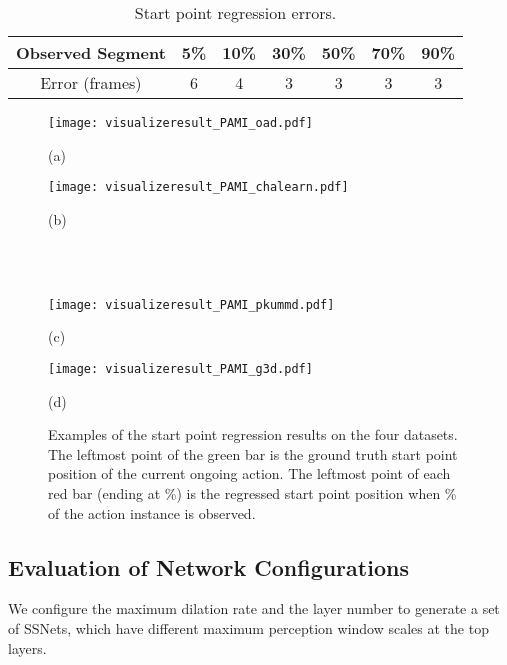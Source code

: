 \documentclass[10pt,twocolumn,letterpaper]{article}
\begin{document}
\begin{table}[tbp]
	\caption{Start point regression errors.}
	\label{table:resultRegErr}
	\centering
	\small
	\begin{tabular}{ccccccc}
		\toprule
Observed Segment       & 5\%   &   10\%   &    30\%   &    50\%    & 70\%  &  90\% \\
		\midrule
		Error (frames)         &   6   &    4     &    3      &    3       &  3    &  3   \\
		\bottomrule
	\end{tabular}
\end{table}



\begin{figure}[tbp]
\begin{minipage}[b]{0.5\linewidth}
		\centering
		\centerline{\texttt{[image: visualizeresult\_PAMI\_oad.pdf]}}
        (a)
\end{minipage}
\begin{minipage}[b]{0.49\linewidth}
		\centering
		\centerline{\texttt{[image: visualizeresult\_PAMI\_chalearn.pdf]}}
        (b)
\end{minipage}
\\
\\
\begin{minipage}[b]{0.5\linewidth}
		\centering
		\centerline{\texttt{[image: visualizeresult\_PAMI\_pkummd.pdf]}}
        (c)
	\end{minipage}
\begin{minipage}[b]{0.49\linewidth}
		\centering
		\centerline{\texttt{[image: visualizeresult\_PAMI\_g3d.pdf]}}
        (d)
\end{minipage}
	\caption{Examples of the start point regression results on the four datasets.
The leftmost point of the green bar is the ground truth start point position of the current ongoing action.
The leftmost point of each red bar (ending at \%) is the regressed start point position when \% of the action instance is observed.
}
	\label{fig:visualizeresult_pami}
\end{figure}



\subsection{Evaluation of Network Configurations}
\label{sec:experiment:netConfig}


We configure the maximum dilation rate and the layer number to generate a set of SSNets,
which have different maximum perception window scales at the top layers.
\end{document}

